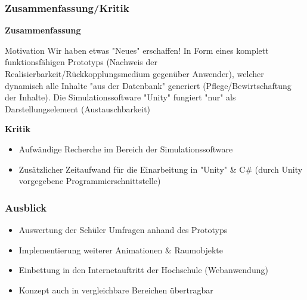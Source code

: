 \documentclass{beamer}
\begin{document}
\begin{frame}
\frametitle{Zusammenfassung/Kritik}
\textbf{Zusammenfassung}
\begin{block}{Motivation}
Wir haben etwas "Neues" erschaffen!
In Form eines komplett funktionsfähigen Prototyps (Nachweis der Realisierbarkeit/Rückkopplungsmedium gegenüber Anwender),
welcher dynamisch alle Inhalte "aus der Datenbank" generiert (Pflege/Bewirtschaftung der Inhalte).
Die Simulationssoftware "Unity" fungiert "nur" als Darstellungselement (Austauschbarkeit)
\end{block}


\textbf{Kritik}
\begin{itemize}
\item {Aufwändige Recherche im Bereich der Simulationssoftware}
\item {Zusätzlicher Zeitaufwand für die Einarbeitung in "Unity" \& C\# (durch Unity vorgegebene Programmierschnittstelle)}
\end{itemize}
\end{frame}


\begin{frame}
\frametitle{Ausblick}
\begin{itemize}
\item {Auswertung der Schüler Umfragen anhand des Prototyps}
\item {Implementierung weiterer Animationen \& Raumobjekte}
\item {Einbettung in den Internetauftritt der Hochschule (Webanwendung)}
\item {Konzept auch in vergleichbare Bereichen übertragbar}
\end{itemize}
\end{frame}
\end{document}
